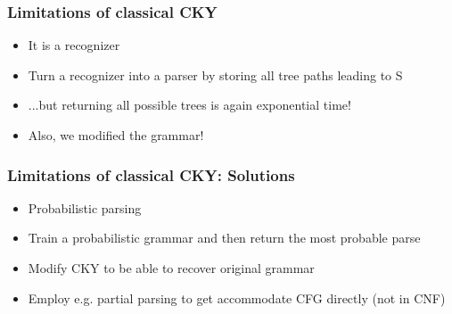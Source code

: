 \documentclass{beamer}
\begin{document}
\begin{frame}
\frametitle{Limitations of classical CKY}
\begin{itemize}
\item It is a recognizer
\item Turn a recognizer into a parser by storing all tree paths leading to S
\item ...but returning all possible trees is again exponential time!
\item Also, we modified the grammar!
\end{itemize}
\end{frame}


\begin{frame}
\frametitle{Limitations of classical CKY: Solutions}
\begin{itemize}
\item Probabilistic parsing
\item Train a probabilistic grammar and then return the most probable parse
\item Modify CKY to be able to recover original grammar
\item Employ e.g. partial parsing to get accommodate CFG directly (not in CNF)
\end{itemize}
\end{frame}
\end{document}
